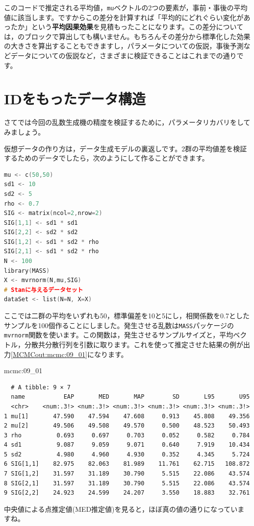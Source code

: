 \documentclass{ltjsbook}
\begin{document}
このコードで推定される平均値，\verb|mu|ベクトルの2つの要素が，事前・事後の平均値に該当します。ですからこの差分を計算すれば「平均的にどれぐらい変化があったか」という\textbf{平均因果効果}を見積もったことになります。この差分については，のブロックで算出しても構いません。もちろんその差分から標準化した効果の大きさを算出することもできますし，パラメータについての仮説，事後予測などデータについての仮説など，さまざまに検証できることはこれまでの通りです。

\section{IDをもったデータ構造}
さてでは今回の乱数生成機の精度を検証するために，パラメータリカバリをしてみましょう。

仮想データの作り方は，データ生成モデルの裏返しです。2群の平均値差を検証するためのデータでしたら，次のようにして作ることができます。

\begin{lstlisting}[language=c++,label={code:09_03},caption={対応ある二群の仮想データ}]
mu <- c(50,50)
sd1 <- 10
sd2 <- 5
rho <- 0.7
SIG <- matrix(ncol=2,nrow=2)
SIG[1,1] <- sd1 * sd1
SIG[2,2] <- sd2 * sd2
SIG[1,2] <- sd1 * sd2 * rho
SIG[2,1] <- sd1 * sd2 * rho
N <- 100
library(MASS)
X <- mvrnorm(N,mu,SIG)
# Stanに与えるデータセット
dataSet <- list(N=N, X=X)
\end{lstlisting}
ここでは二群の平均をいずれも50，標準偏差を10と5にし，相関係数を0.7としたサンプルを100個作ることにしました。発生させる乱数は\verb|MASS|パッケージの\verb|mvrnorm|関数を使います。この関数は，発生させるサンプルサイズと，平均ベクトル，分散共分散行列を引数に取ります。これを使って推定させた結果の例が出力\ref{MCMCout:mcmc:09_01}になります。

\begin{MCMCout}{}{mcmc:09_01}
	\begin{verbatim}
  # A tibble: 9 × 7
  name           EAP       MED       MAP        SD       L95       U95
  <chr>    <num:.3!> <num:.3!> <num:.3!> <num:.3!> <num:.3!> <num:.3!>
1 mu[1]       47.590    47.594    47.608     0.913    45.808    49.356
2 mu[2]       49.506    49.508    49.570     0.500    48.523    50.493
3 rho          0.693     0.697     0.703     0.052     0.582     0.784
4 sd1          9.087     9.059     9.071     0.640     7.919    10.434
5 sd2          4.980     4.960     4.930     0.352     4.345     5.724
6 SIG[1,1]    82.975    82.063    81.989    11.761    62.715   108.872
7 SIG[1,2]    31.597    31.189    30.790     5.515    22.086    43.574
8 SIG[2,1]    31.597    31.189    30.790     5.515    22.086    43.574
9 SIG[2,2]    24.923    24.599    24.207     3.550    18.883    32.761
\end{verbatim}
\end{MCMCout}
中央値による点推定値(MED推定値)を見ると，ほぼ真の値の通りになっていますね。
\end{document}
